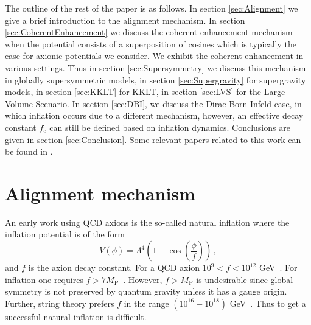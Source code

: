 \documentclass[12pt]{article}
\begin{document}
The outline of the rest of the paper is as follows.
In section \ref{sec:Alignment} we give a brief introduction to the alignment mechanism.
In section \ref{sec:CoherentEnhancement} we discuss the coherent enhancement mechanism when the potential consists of a superposition of cosines which is typically the case for axionic potentials we consider.
We exhibit the coherent enhancement in various settings.
Thus in section \ref{sec:Supersymmetry} we discuss this mechanism in globally supersymmetric models, in section \ref{sec:Supergravity} for supergravity models, in section \ref{sec:KKLT} for KKLT, in section \ref{sec:LVS} for the Large Volume Scenario.
In section \ref{sec:DBI}, we discuss the Dirac-Born-Infeld case, in which inflation occurs due to a different mechanism, however, an effective decay constant $f_e$ can still be defined based on inflation dynamics.
Conclusions are given in section \ref{sec:Conclusion}.
Some relevant papers related to this work can be found in \cite{BlancoPillado:2006he, Conlon:2005jm, Ben-Dayan:2014lca, Gao:2014uha}.

\section{Alignment mechanism \label{sec:Alignment}}
An early work using QCD axions is the so-called natural inflation where the inflation potential is of the form
\begin{equation} \label{eq:naturalInflationPotential}
  V\left(\phi\right) = \Lambda^4 \left(1 - \cos\left(\frac{\phi}{f}\right)\right)\,,
\end{equation}
and $f$ is the axion decay constant.
For a QCD axion $10^9 < f < 10^{12}$ GeV~\cite{Svrcek:2006yi}.
For inflation one requires $f > 7 M_\text{P}$~\cite{Ade:2015lrj}.
However, $f > M_\text{P}$ is undesirable since global symmetry is not preserved by quantum gravity unless it has a gauge origin.
Further, string theory prefers $f$ in the range $\left(10^{16} - 10^{18}\right)$ GeV~\cite{Svrcek:2006yi}.
Thus to get a successful natural inflation is difficult.
\end{document}
